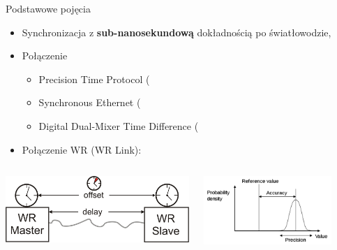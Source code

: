 \documentclass[compress,red]{beamer}
\begin{document}
\begin{frame}{Podstawowe pojęcia}

  \begin{itemize}
    \item Synchronizacja z {\bf sub-nanosekundową} dokładnością po światłowodzie,
    \item Połączenie
	\begin{itemize}
	  \item Precision Time Protocol (\color{blue}{PTP}\color{black}{) - synchronizacja,}
	  \item Synchronous Ethernet (\color{blue}{SyncE}\color{black}{) syntonizacja,}
	  \item Digital Dual-Mixer Time Difference (\color{blue}{DDMTD}\color{black}{) - pomiar fazy,}

	\end{itemize}
    \item Połączenie WR (WR Link):
  \end{itemize}

\begin{columns}[c]

  \begin{center}
  \includegraphics[height=2.5cm]{protocol/wrLink.pdf}
  \end{center}

  \vspace{2cm}


  \begin{center}
  \includegraphics[height=2.6cm]{misc/Accuracy_and_precision.pdf}
  \end{center}

  \vspace{1cm}

\end{columns}


\end{frame}
\end{document}
